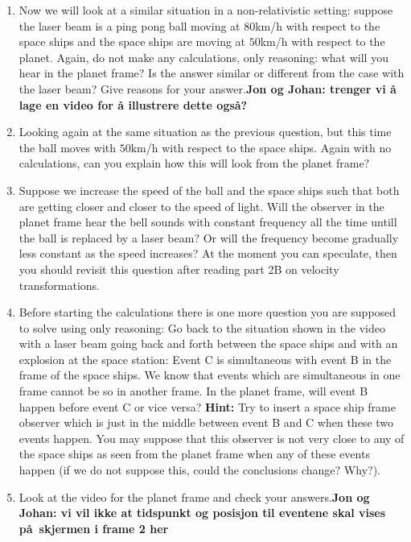 {\begin{multicols}{2}
\begin{enumerate}
\item Now we will look at a similar situation in a non-relativistic setting: suppose the laser beam is a ping pong ball moving at $80$km/h with respect to the space ships and the space ships are moving at $50$km/h with respect to the planet. Again, do not make any calculations, only reasoning: what will you hear in the planet frame? Is the answer similar or different from the case with the laser beam? Give reasons for your answer.{\bf Jon og Johan: trenger vi å lage en video for å illustrere dette ogs\aa ?}

\item Looking again at the same situation as the previous question, but this time the ball moves with  $50$km/h with respect to the space ships. Again with no calculations, can you explain how this will look from the planet frame?

\item Suppose we increase the speed of the ball and the space ships such that both are getting closer and closer to the speed of light. Will the observer in the planet frame hear the bell sounds with constant frequency all the time untill the ball is replaced by a laser beam? Or will the frequency become gradually less constant as the speed increases? At the moment you can speculate, then you should revisit this question after reading part 2B on velocity transformations.

\item Before starting the calculations there is one more question you are supposed to solve using only reasoning: Go back to the situation shown in the video with a laser beam going back and forth between the space ships and with an explosion at the space station: Event C is simultaneous with event B in the frame of the space ships. We know that events which are simultaneous in one frame cannot be so in another frame. In the planet frame, will event B happen before event C or vice versa? {\bf Hint:} Try to insert a space ship frame observer which is just in the middle between event B and C when these two events happen. You may suppose that this observer is not very close to any of the space ships as seen from the planet frame when any of these events happen  (if we do not suppose this, could the conclusions change? Why?).

\item Look at the video for the planet frame and check your answers.{\bf Jon og Johan: vi vil ikke at tidspunkt og posisjon til eventene skal vises p\aa\  skjermen i frame 2 her}


\end{enumerate}
\end{multicols}}
